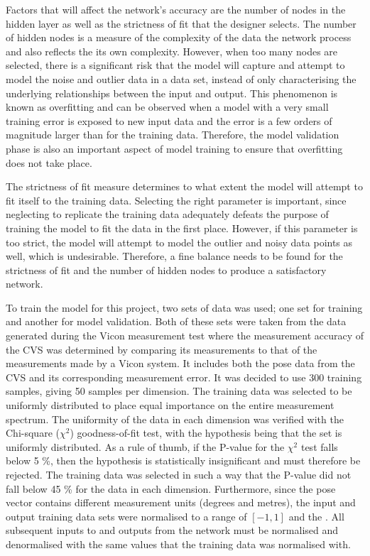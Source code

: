 Factors that will affect the network's accuracy are the number of nodes in the hidden layer as well as the strictness of fit that the designer selects. The number of hidden nodes is a measure of the complexity of the data the network process and also reflects the its own complexity. However, when too many nodes are selected, there is a significant risk that the model will capture and attempt to model the noise and outlier data in a data set, instead of only characterising the underlying relationships between the input and output. This phenomenon is known as overfitting and can be observed when a model with a very small training error is exposed to new input data and the error is a few orders of magnitude larger than for the training data. Therefore, the model validation phase is also an important aspect of model training to ensure that overfitting does not take place. 

The strictness of fit measure determines to what extent the model will attempt to fit itself to the training data. Selecting the right parameter is important, since neglecting to replicate the training data adequately defeats the purpose of training the model to fit the data in the first place. However, if this parameter is too strict, the model will attempt to model the outlier and noisy data points as well, which is undesirable. Therefore, a fine balance needs to be found for the strictness of fit and the number of hidden nodes to produce a satisfactory network.  

To train the model for this project, two sets of data was used; one set for training and another for model validation. Both of these sets were taken from the data generated during the Vicon measurement test where the measurement accuracy of the CVS was determined by comparing its measurements to that of the measurements made by a Vicon system. It includes both the pose data from the CVS and its corresponding measurement error. It was decided to use 300 training samples, giving 50 samples per dimension. The training data was selected to be uniformly distributed to place equal importance on the entire measurement spectrum. The uniformity of the data in each dimension was verified with the Chi-square ($\chi^2$) goodness-of-fit test, with the hypothesis being that the set is uniformly distributed. As a rule of thumb, if the P-value for the $\chi^2$ test falls below 5 \%, then the hypothesis is statistically insignificant and must therefore be rejected. The training data was selected in such a way that the P-value did not fall below 45 \% for the data in each dimension. Furthermore, since the pose vector contains different measurement units (degrees and metres), the input and output training data sets were normalised to a range of $[-1, 1]$ and the . All subsequent inputs to and outputs from the network must be normalised and denormalised with the same values that the training data was normalised with.  

